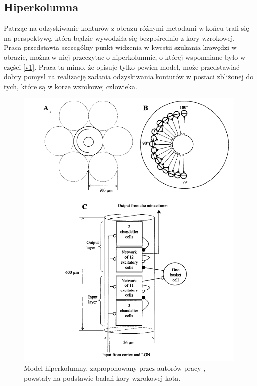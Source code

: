 \subsection{Hiperkolumna}
\label{hypercolumn}

Patrząc na odzyskiwanie konturów z obrazu różnymi metodami w końcu trafi się na perspektywę, która będzie wywodziła się bezpośrednio z kory wzrokowej. Praca \cite{Curulku} przedstawia szczególny punkt widzenia w kwestii szukania krawędzi w obrazie, można w niej przeczytać o hiperkolumnie, o której wspomniane było w części \ref{v1}. Praca ta mimo, że opisuje tylko pewien model, może przedstawiać dobry pomysł na realizację zadania odzyskiwania konturów w postaci zbliżonej do tych, które są w korze wzrokowej człowieka.\\

\begin{figure}[ht]
	\centering
	\includegraphics[width=.75\textwidth]{images/Hypercolumn.png}
	\caption{Model hiperkolumny, zaproponowany przez autorów pracy \cite{Curulku}, powstały na podstawie badań kory wzrokowej kota.}
	\label{fig:hypercolumn_model}
\end{figure}


